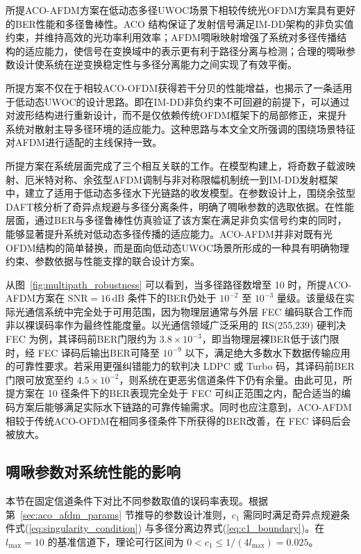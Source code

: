 所提ACO-AFDM方案在低动态多径UWOC场景下相较传统光OFDM方案具有更好的BER性能和多径鲁棒性。ACO 结构保证了发射信号满足IM-DD架构的非负实值约束，并维持高效的光功率利用效率；AFDM啁啾映射增强了系统对多径传播结构的适应能力，使信号在变换域中的表示更有利于路径分离与检测；合理的啁啾参数设计使系统在逆变换稳定性与多径分离能力之间实现了有效平衡。

所提方案不仅在于相较ACO-OFDM获得若干分贝的性能增益，也揭示了一条适用于低动态UWOC的设计思路。即在IM-DD非负约束不可回避的前提下，可以通过对波形结构进行重新设计，而不是仅依赖传统OFDM框架下的局部修正，来提升系统对散射主导多径环境的适应能力。这种思路与本文全文所强调的围绕场景特征对AFDM进行适配的主线保持一致。

所提方案在系统层面完成了三个相互关联的工作。在模型构建上，将奇数子载波映射、厄米特对称、余弦型AFDM调制与非对称限幅机制统一到IM-DD发射框架中，建立了适用于低动态多径水下光链路的收发模型。在参数设计上，围绕余弦型DAFT核分析了奇异点规避与多径分离条件，明确了啁啾参数的选取依据。在性能层面，通过BER与多径鲁棒性仿真验证了该方案在满足非负实信号约束的同时，能够显著提升系统对低动态多径传播的适应能力。ACO-AFDM并非对既有光OFDM结构的简单替换，而是面向低动态UWOC场景所形成的一种具有明确物理约束、参数依据与性能支撑的联合设计方案。

从图~\ref{fig:multipath_robustness} 可以看到，当多径路径数增至 10 时，所提ACO-AFDM方案在 $\mathrm{SNR}=16\,\mathrm{dB}$ 条件下的BER仍处于 $10^{-2}$ 至 $10^{-3}$ 量级。该量级在实际光通信系统中完全处于可用范围，因为物理层通常与外层 FEC 编码联合工作而非以裸误码率作为最终性能度量。以光通信领域广泛采用的 RS(255,239) 硬判决 FEC 为例，其译码前BER门限约为 $3.8\times10^{-3}$，即当物理层裸BER低于该门限时，经 FEC 译码后输出BER可降至 $10^{-9}$ 以下，满足绝大多数水下数据传输应用的可靠性要求。若采用更强纠错能力的软判决 LDPC 或 Turbo 码，其译码前BER门限可放宽至约 $4.5\times10^{-2}$，则系统在更恶劣信道条件下仍有余量。由此可见，所提方案在 10 径条件下的BER表现完全处于 FEC 可纠正范围之内，配合适当的编码方案后能够满足实际水下链路的可靠传输需求。同时也应注意到，ACO-AFDM相较于传统ACO-OFDM在相同多径条件下所获得的BER改善，在 FEC 译码后会被放大。

\subsection{啁啾参数对系统性能的影响}
\label{subsec:chirp_param_sensitivity}

本节在固定信道条件下对比不同参数取值的误码率表现。根据第~\ref{sec:aco_afdm_params} 节推导的参数设计准则，$c_1$ 需同时满足奇异点规避条件式(\ref{eq:singularity_condition}) 与多径分离边界式(\ref{eq:c1_boundary})。在 $l_{\max}=10$ 的基准信道下，理论可行区间为 $0 < c_1 \leq 1/(4l_{\max}) = 0.025$。

